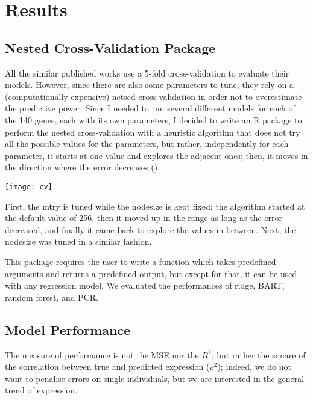 \section{Results}

\subsection{Nested Cross-Validation Package}

All the similar published works use a 5-fold cross-validation to 
evaluate their models. However, since there are also some parameters to 
tune, they rely on a (computationally expensive) netsed cross-validation 
in order not to overestimate the predictive power. Since I needed to run 
several different models for each of the 140 genes, each with its own 
parameters, I decided to write an R 
package to perform 
the nested cross-validation with a heuristic algorithm that does not try 
all the possible values for the parameters, but rather, independently 
for each parameter, it starts at one value and explores the adjacent 
ones; then, it moves in the direction where the error decreases
().

\begin{marginfigure}[-5.55cm]
  \centering
  \texttt{[image: cv]}
  \caption{First, the mtry is tuned while the nodesize is kept fixed; 
the algorithm started at the default value of 256, then it moved up in 
the range as long as the error decreased, and finally it came back to 
explore the values in between. Next, the nodesize was tuned in a similar 
fashion.}
\end{marginfigure}

This package requires the user to write a function which takes 
predefined arguments and returns a predefined output, but except for 
that, it can be used with any regression model. We evaluated the 
performances of ridge, BART, random forest, and PCR. 

\subsection{Model Performance}

The measure of performance is not the MSE nor the $R^2$, but rather the 
square of the correlation between true and predicted expression 
($\rho^2$); indeed, we do not want to penalise errors on single 
individuals, but we are interested in the general trend of expression.

